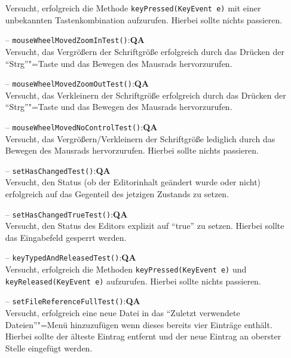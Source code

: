 \documentclass[parskip=full,11pt,twoside]{scrartcl}
\def\qa{\hfill\textbf{QA}}
\begin{document}
\begin{itemize}
	Versucht, erfolgreich die Methode \texttt{keyPressed(KeyEvent e)} mit einer unbekannten Tastenkombination aufzurufen. Hierbei sollte nichts passieren.
	\item[--] \texttt{mouseWheelMovedZoomInTest()}:\qa\\
	Versucht, das Vergrößern der Schriftgröße erfolgreich durch das Drücken der \enquote{Strg}"=Taste und das Bewegen des Mausrads hervorzurufen.
	\item[--] \texttt{mouseWheelMovedZoomOutTest()}:\qa\\
	Versucht, das Verkleinern der Schriftgröße erfolgreich durch das Drücken der \enquote{Strg}"=Taste und das Bewegen des Mausrads hervorzurufen.
	\item[--] \texttt{mouseWheelMovedNoControlTest()}:\qa\\
	Versucht, das Vergrößern/Verkleinern der Schriftgröße lediglich durch das Bewegen des Mausrads hervorzurufen. Hierbei sollte nichts passieren.
	\item[--] \texttt{setHasChangedTest()}:\qa\\
	Versucht, den Status (ob der Editorinhalt geändert wurde oder nicht) erfolgreich auf das Gegenteil des jetzigen Zustands zu setzen.
	\item[--] \texttt{setHasChangedTrueTest()}:\qa\\
	Versucht, den Status des Editors explizit auf \enquote{true} zu setzen. Hierbei sollte das Eingabefeld gesperrt werden.
	\item[--] \texttt{keyTypedAndReleasedTest()}:\qa\\
	Versucht, erfolgreich die Methoden \texttt{keyPressed(KeyEvent e)} und\\\texttt{keyReleased(KeyEvent e)} aufzurufen. Hierbei sollte nichts passieren.
	\item[--] \texttt{setFileReferenceFullTest()}:\qa\\
	Versucht, erfolgreich eine neue Datei in das \enquote{Zuletzt verwendete Dateien}"=Menü hinzuzufügen wenn dieses bereits vier Einträge enthält. Hierbei sollte der älteste Eintrag entfernt und der neue Eintrag an oberster Stelle eingefügt werden.
\end{itemize}
\end{document}
